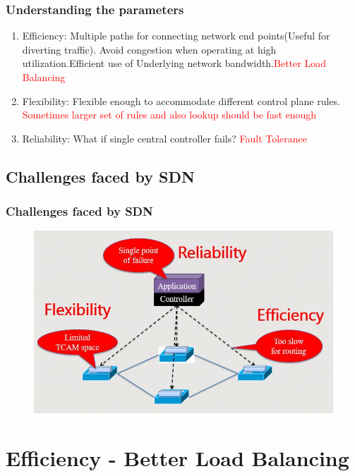\documentclass{beamer}
\begin{document}
\begin{frame}
	\frametitle{Understanding the parameters}
		\begin{enumerate}
			\item Efficiency: Multiple paths for connecting network end points(Useful for diverting traffic). Avoid congestion when operating at high utilization.Efficient use of Underlying network bandwidth.\textcolor{red}{Better Load Balancing}
			\item Flexibility: Flexible enough to accommodate different control plane rules. \textcolor{red}{Sometimes larger set of rules and also lookup should be fast enough}
			\item Reliability: What if single central controller fails?  \textcolor{red}{Fault Tolerance}
		\end{enumerate}
\end{frame}

\subsection{Challenges faced by SDN}

\begin{frame}
	\frametitle{Challenges faced by SDN}
	\begin{figure}
		\includegraphics[width=0.8\linewidth]{3}
	\end{figure}
\end{frame}

\section{Efficiency - Better Load Balancing}
\end{document}
